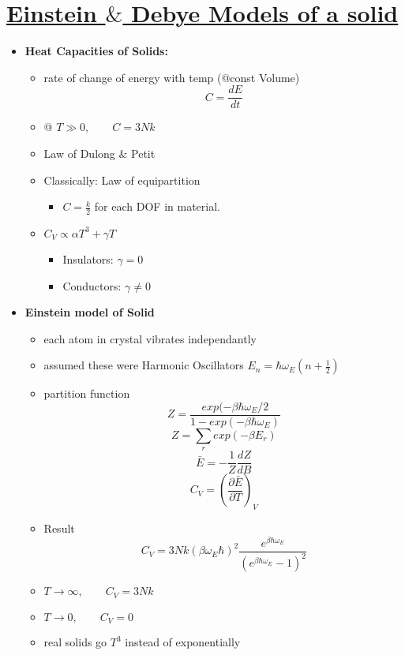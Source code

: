 \section[Einstein $\&$ Debye Models of a solid]{\hyperlink{toc}{Einstein $\&$ Debye Models of a solid}}


\begin{itemize}
    \item \textbf{Heat Capacities of Solids:}
    \begin{itemize}
        \item rate of change of energy with temp (@const Volume)
        \[C = \frac{dE}{dt} \]
        \item @ $T \gg 0 , \qquad C=3Nk$
        \item Law of Dulong $\&$ Petit
        \item Classically: Law of equipartition
        \begin{itemize}
            \item $C=\frac{k}{2}$ for each DOF in material.
        \end{itemize}
        \item $C_V \propto \alpha T^3 + \gamma T$
        \begin{itemize}
            \item Insulators: $\gamma=0$
            \item Conductors: $\gamma\neq0$
        \end{itemize}
    \end{itemize}
    \item \textbf{Einstein model of Solid}
    \begin{itemize}
        \item each atom in crystal vibrates independantly
        \item assumed these were Harmonic Oscillators $E_n=\hbar \omega_E(n+\frac{1}{2})$
        \item partition function
        \[Z = \frac{exp(-\beta \hbar \omega_E /2}{1-exp(-\beta\hbar\omega_E)}\]
        \[Z = \sum_r exp(-\beta E_r) \]
        \[\bar{E} = -\frac{1}{Z} \frac{dZ}{dB} \]
        \[ C_V = \left(\frac{\partial \bar{E}}{\partial T}\right)_V \]
        \item Result
        \[C_V=3Nk(\beta \omega_E \hbar)^2 \frac{e^{\beta \hbar \omega_E}}{(e^{\beta \hbar \omega_E}-1)^2}\]
        \item $T\rightarrow \infty , \qquad C_V = 3Nk$ 
        \item $T\rightarrow 0, \qquad C_V = 0 $
        \item real solids go $T^3$ instead of exponentially

\end{itemize}
\end{itemize}
